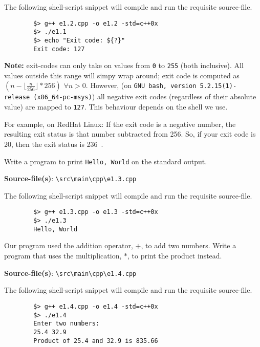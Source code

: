 \documentclass[12pt, a4paper]{article}
\begin{document}
    \noindent The following shell-script snippet will compile and run the requisite source-file.
    \begin{verbatim}
        $> g++ e1.2.cpp -o e1.2 -std=c++0x
        $> ./e1.1
        $> echo "Exit code: ${?}"
        Exit code: 127
    \end{verbatim}

    \noindent\textbf{Note:} exit-codes can only take on values from \texttt{0} to \texttt{255} (both inclusive).
    All values outside this range will simpy wrap around; exit code is computed as $(n - \lfloor\frac{n}{256}\rfloor * 256)\,\,\forall n > 0$.
    However, (on \texttt{GNU bash, version 5.2.15(1)-release (x86\_64-pc-msys)}) all negative exit codes (regardless of their absolute value) are mapped to \texttt{127}.
    This behaviour depends on the shell we use.

    \noindent For example, on RedHat Linux: If the exit code is a negative number, the resulting exit status is that number subtracted from 256.
    So, if your exit code is 20, then the exit status is 236~\cite{rhl-neg-exit-code}.

    \bigskip
    \begin{tcolorbox}[title={Exercise: 1.3}]
        Write a program to print \texttt{Hello, World} on the standard output.
    \end{tcolorbox}
    \noindent\textbf{Source-file(s)}: \texttt{\textbackslash src\textbackslash main\textbackslash cpp\textbackslash e1.3.cpp}

    \noindent The following shell-script snippet will compile and run the requisite source-file.
    \begin{verbatim}
        $> g++ e1.3.cpp -o e1.3 -std=c++0x
        $> ./e1.3
        Hello, World
    \end{verbatim}

    \bigskip
    \begin{tcolorbox}[title={Exercise: 1.4}]
        Our program used the addition operator, $+$, to add two numbers.
        Write a program that uses the multiplication, $*$, to print the product instead.
    \end{tcolorbox}
    \noindent\textbf{Source-file(s)}: \texttt{\textbackslash src\textbackslash main\textbackslash cpp\textbackslash e1.4.cpp}

    \noindent The following shell-script snippet will compile and run the requisite source-file.
    \begin{verbatim}
        $> g++ e1.4.cpp -o e1.4 -std=c++0x
        $> ./e1.4
        Enter two numbers:
        25.4 32.9
        Product of 25.4 and 32.9 is 835.66
    \end{verbatim}
\end{document}
